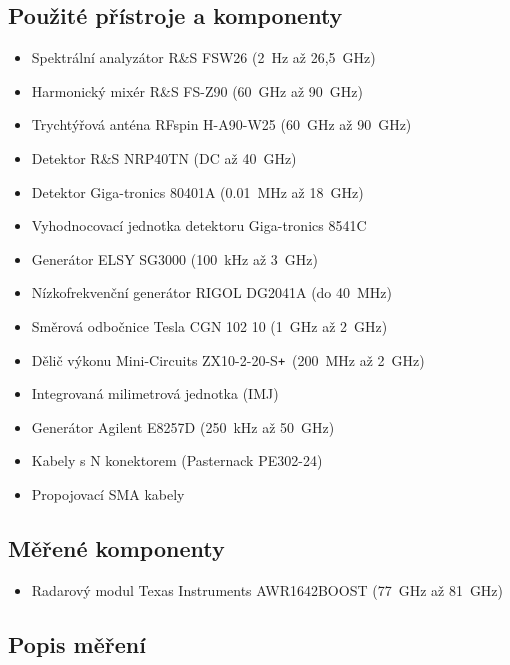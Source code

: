 \documentclass[11pt,a4paper]{article}
\newcommand{\plus}{{\texttt{+}}}
\begin{document}
\subsection*{Použité přístroje a komponenty}
\begin{itemize}
    \item Spektrální analyzátor R\&S FSW26 (2~Hz až 26,5~GHz)
    \item Harmonický mixér R\&S FS-Z90 (60~GHz až 90~GHz)
    \item Trychtýřová anténa RFspin H-A90-W25 (60~GHz až 90~GHz)
    \item Detektor R\&S NRP40TN (DC až 40~GHz)
    \item Detektor Giga-tronics 80401A (0.01~MHz až 18~GHz)
    \item Vyhodnocovací jednotka detektoru Giga-tronics 8541C
    \item Generátor ELSY SG3000 (100~kHz až 3~GHz)
    \item Nízkofrekvenční generátor RIGOL DG2041A (do 40~MHz)
    \item Směrová odbočnice Tesla CGN 102 10 (1~GHz až 2~GHz)
    \item Dělič výkonu Mini-Circuits ZX10-2-20-S\plus\ (200~MHz až 2~GHz)
    \item Integrovaná milimetrová jednotka (IMJ)
    \item Generátor Agilent E8257D (250~kHz až 50~GHz)
    \item Kabely s N konektorem (Pasternack PE302-24)
    \item Propojovací SMA kabely
\end{itemize}

\subsection*{Měřené komponenty}
\begin{itemize}
    \item Radarový modul Texas Instruments AWR1642BOOST (77~GHz až 81~GHz)
\end{itemize}

\subsection*{Popis měření}

\end{document}
